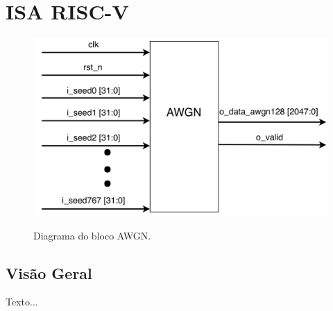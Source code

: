 \section{ISA RISC-V} %
\label{sec:isa_riscv}

\begin{figure}[!htb]
  \caption{Diagrama do bloco AWGN.}
  \vspace{0.2cm}
  \includegraphics[width=\linewidth]{images/bloco.png}
  \label{fig:top}
\end{figure}

\subsection{Visão Geral}
Texto...

